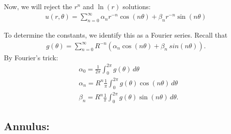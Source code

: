 \documentclass{book}
\theoremstyle{definition}
\newcommand{\f}[2]{\frac{#1}{#2}}
\begin{document}
Now, we will reject the $r^n$ and $\ln(r)$ solutions:
\begin{align*}
\boxed{u(r,\theta) = \sum^\infty_{n=0}\alpha_n r^{-n}\cos(n\theta) + \beta_n r^{-n}\sin(n\theta)} 
\end{align*} 

To determine the constants, we identify this as a Fourier series. Recall that
\begin{align*}
g(\theta) = \sum^\infty_{n=0}R^{-n}(\alpha_n \cos(n\theta) + \beta_n\ sin(n\theta)).
\end{align*}
By Fourier's trick:
\begin{align*}
&\alpha_0 = \f{1}{2\pi}\int^{2\pi}_0 g(\theta)\,d\theta\\
&\alpha_n = R^{n}\f{1}{\pi}\int^{2\pi}_0 g(\theta)\cos(n\theta)\,d\theta\\
&\beta_n = R^{n}\f{1}{\pi}\int^{2\pi}_0 g(\theta)\sin(n\theta)\,d\theta.
\end{align*}





\subsection{Annulus:}
\end{document}
